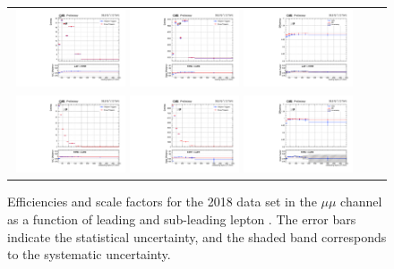 \begin{figure}[h]
  \begin{center}
    \begin{tabular}{ccc}
      \includegraphics[width=0.32\textwidth]{fig_2018_TrigSF/g_lepApt_mumu_MC.pdf}
      \includegraphics[width=0.32\textwidth]{fig_2018_TrigSF/g_lepApt_mumu_data.pdf}
      \includegraphics[width=0.32\textwidth]{fig_2018_TrigSF/g_mumu_lepApt_FullSystUncBand.pdf}\\
      \includegraphics[width=0.32\textwidth]{fig_2018_TrigSF/g_lepBpt_mumu_MC.pdf}
      \includegraphics[width=0.32\textwidth]{fig_2018_TrigSF/g_lepBpt_mumu_data.pdf}
      \includegraphics[width=0.32\textwidth]{fig_2018_TrigSF/g_mumu_lepBpt_FullSystUncBand.pdf}\\
    \end{tabular}
    \caption{Efficiencies and scale factors for the 2018 data set in the $\mu\mu$ channel as a function of leading and sub-leading lepton \pT.
            The error bars indicate the statistical uncertainty, and the shaded band corresponds to the systematic uncertainty.
            }
    \label{TrigSF_2018_3}
  \end{center}
\end{figure}

